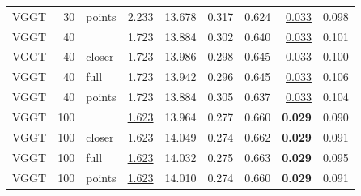 \begin{table}[H]
\begin{tabular}{lrlrrrrrr}
VGGT & 30 & points & 2.233 & 13.678 & 0.317 & 0.624 & \underline{0.033} & 0.098 \\
VGGT & 40 &  & 1.723 & 13.884 & 0.302 & 0.640 & \underline{0.033} & 0.101 \\
VGGT & 40 & closer & 1.723 & 13.986 & 0.298 & 0.645 & \underline{0.033} & 0.100 \\
VGGT & 40 & full & 1.723 & 13.942 & 0.296 & 0.645 & \underline{0.033} & 0.106 \\
VGGT & 40 & points & 1.723 & 13.884 & 0.305 & 0.637 & \underline{0.033} & 0.104 \\
VGGT & 100 &  & \underline{1.623} & 13.964 & 0.277 & 0.660 & \textbf{0.029} & 0.090 \\
VGGT & 100 & closer & \underline{1.623} & 14.049 & 0.274 & 0.662 & \textbf{0.029} & 0.091 \\
VGGT & 100 & full & \underline{1.623} & 14.032 & 0.275 & 0.663 & \textbf{0.029} & 0.095 \\
VGGT & 100 & points & \underline{1.623} & 14.010 & 0.274 & 0.660 & \textbf{0.029} & 0.091 \\
\bottomrule
\end{tabular}
\end{table}
